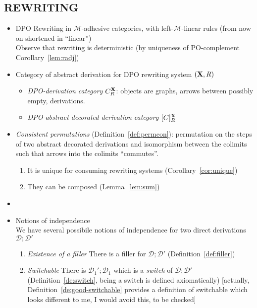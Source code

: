 \documentclass[a4paper,UKenglish,cleveref,pdftex, thm-restate,numberwithinsect,anonymous]{lipics}
\newcommand{\dpo}{\textsc{dpo}}
\def\R{\mathsf{R}}
\def\X{\textbf {\textup{X}}}
\newcommand{\dder}[1]{\mathscr{#1}}
\def\dpo{\mathsf{C}^{\X}_R}
\def\dpi{[\mathsf{C}]^{\X}_R}
\begin{document}
\subsection*{REWRITING}
\begin{itemize}
\item DPO Rewriting in $\mathcal{M}$-adhesive categories, with left-$\mathcal{M}$-linear rules (from now on shortened in ``linear'')\\
  Observe that rewriting is deterministic (by uniqueness of
  PO-complement Corollary~\ref{lem:radj})
  
\item Category of abstract derivation for DPO rewriting system $(\X, \R)$
  \begin{itemize}
  \item \emph{DPO-derivation category} $\dpo$: objects are graphs,
    arrows between possibly empty, derivations.
  \item \emph{DPO-abstract decorated derivation category} $\dpi$
  \end{itemize}
  
  
  
\item \emph{Consistent permutations} (Definition~\ref{def:permcon}):
  permutation on the steps of two abstract decorated derivations and
  isomorphism between the colimits such that arrows into the colimits
  ``commutes''.
  \begin{enumerate}
  \item It is unique for consuming
    rewriting systems (Corollary~\ref{cor:unique})
  \item They can be composed
    (Lemma~\ref{lem:sum})
  \end{enumerate}
\item
  
  
\item Notions of independence\\ We have several
  possibile notions of independence for two direct derivations $\dder{D}
  ; \dder{D'}$
  \begin{enumerate}
    
  \item \emph{Existence of a filler} There
is a filler for $\dder{D} ; \dder{D'}$ (Definition~\ref{def:filler})

\item \emph{Switchable} There is
  $\dder{D}_1' ; \dder{D}_1$ which is a \emph{switch} of $\dder{D} ;
  \dder{D'}$ (Definition~\ref{de:switch}, being a switch is defined
  axiomatically) [actually, Definition~\ref{de:good-switchable} provides
  a definition of switchable which looks different to me, I would avoid
  this, to be checked]
  

\end{enumerate}
\end{itemize}
\end{document}
